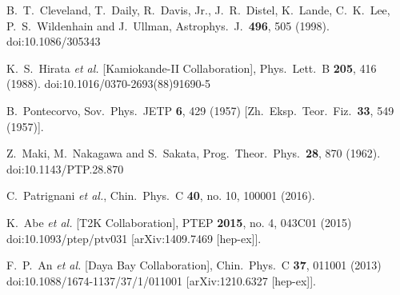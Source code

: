 \documentclass[a4 paper,12pt]{report}%
\begin{document}
\begin{thebibliography}{9}
  B.~T.~Cleveland, T.~Daily, R.~Davis, Jr., J.~R.~Distel, K.~Lande, C.~K.~Lee, P.~S.~Wildenhain and J.~Ullman,
  Astrophys.\ J.\  {\bf 496}, 505 (1998).
  doi:10.1086/305343

  K.~S.~Hirata {\it et al.} [Kamiokande-II Collaboration],
  Phys.\ Lett.\ B {\bf 205}, 416 (1988).
  doi:10.1016/0370-2693(88)91690-5

  B.~Pontecorvo,
  Sov.\ Phys.\ JETP {\bf 6}, 429 (1957)
  [Zh.\ Eksp.\ Teor.\ Fiz.\  {\bf 33}, 549 (1957)].


  Z.~Maki, M.~Nakagawa and S.~Sakata,
  Prog.\ Theor.\ Phys.\  {\bf 28}, 870 (1962).
  doi:10.1143/PTP.28.870
  
  C.~Patrignani {\it et al.},
  Chin.\ Phys.\ C {\bf 40}, no. 10, 100001 (2016).


  K.~Abe {\it et al.} [T2K Collaboration],
  PTEP {\bf 2015}, no. 4, 043C01 (2015)
  doi:10.1093/ptep/ptv031
  [arXiv:1409.7469 [hep-ex]].
  
  F.~P.~An {\it et al.} [Daya Bay Collaboration],
  Chin.\ Phys.\ C {\bf 37}, 011001 (2013)
  doi:10.1088/1674-1137/37/1/011001
  [arXiv:1210.6327 [hep-ex]].




\end{thebibliography}
\end{document}
